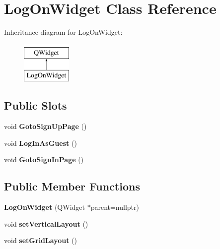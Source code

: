 \hypertarget{classLogOnWidget}{\section{Log\-On\-Widget Class Reference}
\label{classLogOnWidget}
}
Inheritance diagram for Log\-On\-Widget\-:\begin{figure}[H]
\begin{center}
\leavevmode
\includegraphics[height=2.000000cm]{classLogOnWidget}
\end{center}
\end{figure}
\subsection*{Public Slots}
\begin{DoxyCompactItemize}
\item 
\hypertarget{classLogOnWidget_a8954686daf8ae217858582249e8d12e5}{void {\bfseries Goto\-Sign\-Up\-Page} ()}\label{classLogOnWidget_a8954686daf8ae217858582249e8d12e5}

\item 
\hypertarget{classLogOnWidget_a650ea5d3139aa86728006cbd3e865f26}{void {\bfseries Log\-In\-As\-Guest} ()}\label{classLogOnWidget_a650ea5d3139aa86728006cbd3e865f26}

\item 
\hypertarget{classLogOnWidget_aefc58cfadb68a5ef7b57bc47a9c90622}{void {\bfseries Goto\-Sign\-In\-Page} ()}\label{classLogOnWidget_aefc58cfadb68a5ef7b57bc47a9c90622}

\end{DoxyCompactItemize}
\subsection*{Public Member Functions}
\begin{DoxyCompactItemize}
\item 
\hypertarget{classLogOnWidget_afae1360f1879334a759db2e3a9aa3037}{{\bfseries Log\-On\-Widget} (Q\-Widget $\ast$parent=nullptr)}\label{classLogOnWidget_afae1360f1879334a759db2e3a9aa3037}

\item 
\hypertarget{classLogOnWidget_aa2da3f5ed0e5a22511e197b8446700ca}{void {\bfseries set\-Vertical\-Layout} ()}\label{classLogOnWidget_aa2da3f5ed0e5a22511e197b8446700ca}

\item 
\hypertarget{classLogOnWidget_ad8b097280c12841ce3e2ce6a4d6a847f}{void {\bfseries set\-Grid\-Layout} ()}\label{classLogOnWidget_ad8b097280c12841ce3e2ce6a4d6a847f}

\end{DoxyCompactItemize}
